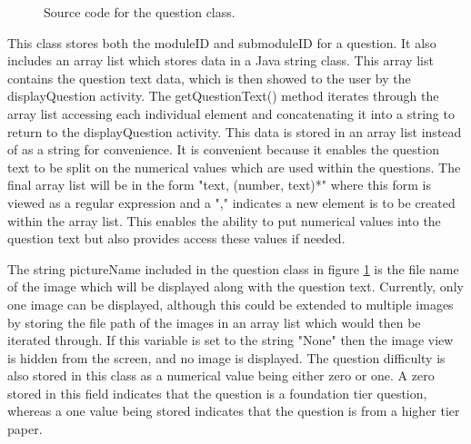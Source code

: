 \documentclass{article}
\begin{document}
\begin{figure}[H]
	\centering
	\caption{Source code for the question class.}
	\label{figure:questionClass}
\end{figure}

This class stores both the moduleID and submoduleID for a question. It also includes an array list which stores data in a Java string class. This array list contains the question text data, which is then showed to the user by the displayQuestion activity. The getQuestionText() method iterates through the array list accessing each individual element and concatenating it into a string to return to the displayQuestion activity. This data is stored in an array list instead of as a string for convenience. It is convenient because it enables the question text to be split on the numerical values which are used within the questions. The final array list will be in the form "text, (number, text)*" where this form is viewed as a regular expression and a "," indicates a new element is to be created within the array list. This enables the ability to put numerical values into the question text but also provides access these values if needed. \par

The string pictureName included in the question class in figure \ref{figure:questionClass} is the file name of the image which will be displayed along with the question text. Currently, only one image can be displayed, although this could be extended to multiple images by storing the file path of the images in an array list which would then be iterated through. If this variable is set to the string "None" then the image view is hidden from the screen, and no image is displayed. The question difficulty is also stored in this class as a numerical value being either zero or one. A zero stored in this field indicates that the question is a foundation tier question, whereas a one value being stored indicates that the question is from a higher tier paper. \par
\end{document}
